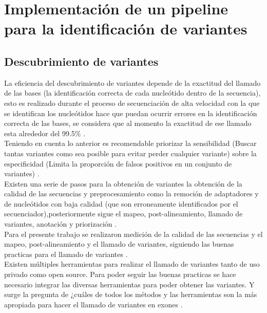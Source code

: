 \chapter{Implementación de un pipeline para la identificación de variantes}

\section{Descubrimiento de variantes}

La eficiencia del descubrimiento de variantes depende de la exactitud del llamado de las bases (la identificación correcta de cada nucleótido dentro de la secuencia), esto es realizado durante el proceso de secuenciación de alta velocidad con la que se identifican los nucleótidos hace que puedan ocurrir errores en la identificación correcta de las bases, se considera que al momento la exactitud de ese llamado esta alrededor del 99.5\% \cite{Tetreault2015}.\\

Teniendo en cuenta lo anterior es recomendable  priorizar la sensibilidad (Buscar tantas variantes como sea posible para evitar perder cualquier variante) sobre la especificidad (Limita la proporción de falsos positivos en un conjunto de variantes) \cite{Auwera2014}.  \\

Existen una serie de pasos para la obtención de variantes la obtención de la calidad de las secuencias y preprocesamiento como la remoción de adaptadores y de nucleótidos con baja calidad (que son erroneamente identificados por el secuenciador),posteriormente sigue el mapeo, post-alineamiento, llamado de variantes, anotación y priorización \cite{Bao2014}.\\

Para el presente trabajo se realizaron medición de la calidad de las secuencias y el mapeo, post-alineamiento y el llamado de variantes, siguiendo las buenas practicas para el llamado de variantes \cite{Fisch2015}. \\

Existen múltiples herramientas para realizar el llamado de variantes tanto de uso privado como open source. Para poder seguir las buenas practicas se hace necesario integrar las diversas herramientas para poder obtener las variantes. Y surge la pregunta de ¿cuáles de todos los métodos y las herramientas son la más apropiada para hacer el llamado de variantes en exones \cite{Bao2014}\cite{Cornish2015}.\\

